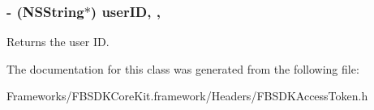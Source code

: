 \subsubsection[{user\+I\+D}]{\setlength{\rightskip}{0pt plus 5cm}-\/ (N\+S\+String$\ast$) user\+I\+D\hspace{0.3cm}{\ttfamily [read]}, {\ttfamily [nonatomic]}, {\ttfamily [copy]}}\label{interface_f_b_s_d_k_access_token_ab8217b11468a826310a27ffe1e79ac7e}
Returns the user I\+D. 

The documentation for this class was generated from the following file\+:\begin{DoxyCompactItemize}
\item 
Frameworks/\+F\+B\+S\+D\+K\+Core\+Kit.\+framework/\+Headers/F\+B\+S\+D\+K\+Access\+Token.\+h\end{DoxyCompactItemize}

